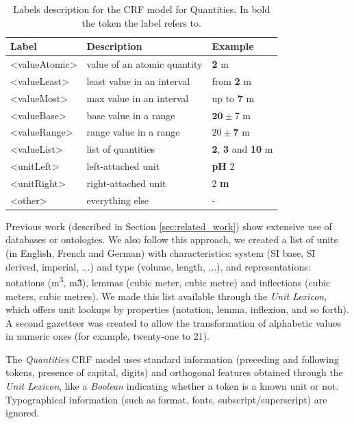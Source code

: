 \documentclass[sigconf]{acmart}
\begin{document}
\begin{table}[ht]
  \caption{Labels description for the CRF model for Quantities. In bold the token the label refers to.}
  \label{tab:quantities-model-labels}
  \begin{tabular}{lll}
    \toprule
    Label & Description & Example\\
    \midrule
    <valueAtomic> & value of an atomic quantity & \textbf{2} m \\
    <valueLeast> & least value in an interval & from \textbf{2} m \\
    <valueMost> & max value in an interval & up to \textbf{7} m \\
    <valueBase> & base value in a range & $\textbf{20}\pm7$ m \\
    <valueRange> & range value in a range & $20 \pm \textbf{7}$ m \\
    <valueList> & list of quantities & \textbf{2}, \textbf{3} and \textbf{10} m \\
    <unitLeft> & left-attached unit & \textbf{pH} 2 \\
    <unitRight> & right-attached unit & 2 \textbf{m} \\
    <other> & everything else & - \\
  \bottomrule
\end{tabular}
\end{table}

Previous work (described in Section \ref{sec:related_work}) show extensive use of databases or ontologies. We also follow this approach, we created a list of units (in English, French and German) with characteristics: system (SI base, SI derived, imperial, ...) and type (volume, length, ...), and representations: notations (m\textsuperscript{3}, m\^3), lemmas (cubic meter, cubic metre) and inflections (cubic meters, cubic metres). We made this list available through the \textit{Unit Lexicon}, which offers unit lookups by properties (notation, lemma, inflexion, and so forth). A second gazetteer was created to allow the transformation of alphabetic values in numeric ones (for example, twenty-one to 21).

The \textit{Quantities} CRF model uses standard information (preceding and following tokens, presence of capital, digits) and orthogonal features obtained through the \textit{Unit Lexicon}, like a \textit{Boolean} indicating whether a token is a known unit or not. Typographical information (such as format, fonts, subscript/superscript) are ignored. 
\end{document}
